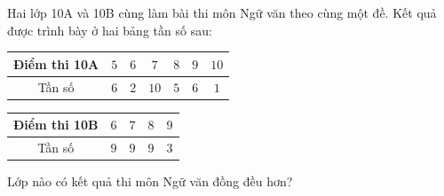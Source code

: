 \begin{ex}
Hai lớp 10A và 10B cùng làm bài thi môn Ngữ văn theo cùng một đề. Kết quả được trình bày ở hai bảng tần số sau:
\begin{center}
\begin{tabular}{|c|c|c|c|c|c|c|}\hline
Điểm thi 10A & $5$ & $6$ & $7$ & $8$ & $9$ & $10$\\\hline
Tần số & $6$ & $2$ & $10$ & $5$ & $6$ & $1$\\\hline
\end{tabular}
\end{center}
\begin{center}
\begin{tabular}{|c|c|c|c|c|}\hline
Điểm thi 10B & $6$ & $7$ & $8$ & $9$\\\hline
Tần số & $9$ & $9$ & $9$ & $3$\\\hline
\end{tabular}
\end{center}
Lớp nào có kết quả thi môn Ngữ văn đồng đều hơn?
\end{ex}
